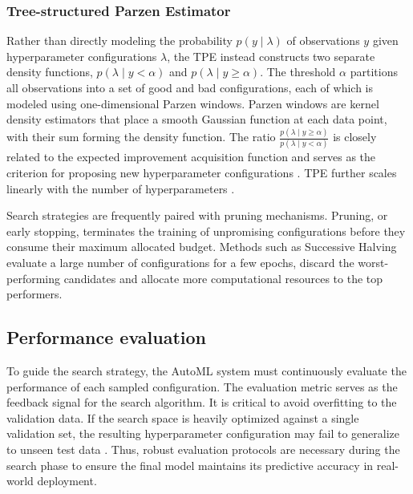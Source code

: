 \subsubsection{Tree-structured Parzen Estimator} 

Rather than directly modeling the probability $p(y \mid \lambda)$ of observations $y$ given hyperparameter configurations $\lambda$, the \ac{TPE} \parencite{bergstra2011algorithms} instead constructs two separate density functions, $p(\lambda \mid y < \alpha)$ and $p(\lambda \mid y \geq \alpha)$. The threshold $\alpha$ partitions all observations into a set of good and bad configurations, each of which is modeled using one-dimensional Parzen windows. 
Parzen windows are kernel density estimators that place a smooth Gaussian function at each data point, with their sum forming the density function.
 The ratio $\frac{p(\lambda\mid y \ge \alpha)}{p(\lambda\mid y < \alpha)}$ is closely related to the expected improvement acquisition function and serves as the criterion for proposing new hyperparameter configurations \parencite{bergstra2011algorithms, hutter2019automated}. \ac{TPE} further scales linearly with the number of hyperparameters \parencite{AutoMLHoos}. %





Search strategies are frequently paired with pruning mechanisms. Pruning, or early stopping, terminates the training of unpromising configurations before they consume their maximum allocated budget. Methods such as Successive Halving evaluate a large number of configurations for a few epochs, discard the worst-performing candidates and allocate more computational resources to the top performers.


\subsection{Performance evaluation}
To guide the search strategy, the \ac{AutoML} system must continuously evaluate the performance of each sampled configuration. The evaluation metric serves as the feedback signal for the search algorithm. It is critical to avoid overfitting to the validation data. If the search space is heavily optimized against a single validation set, the resulting hyperparameter configuration may fail to generalize to unseen test data \parencite{hutter2019automated}. Thus, robust evaluation protocols are necessary during the search phase to ensure the final model maintains its predictive accuracy in real-world deployment.



